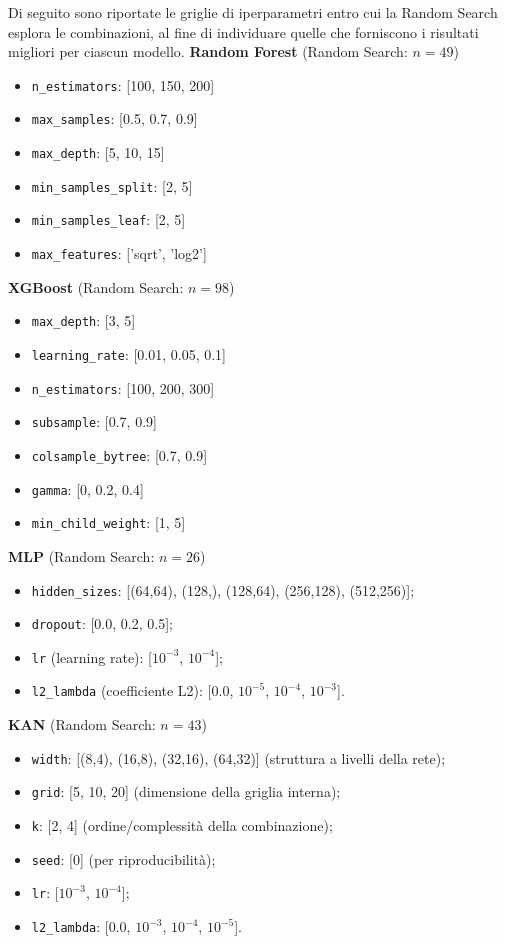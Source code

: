 \documentclass[a4paper,12pt]{report}
\begin{document}
	Di seguito sono riportate le griglie di iperparametri entro cui la Random Search esplora le combinazioni, al fine di individuare quelle che forniscono i risultati migliori per ciascun modello.
	\smallskip
	\noindent\textbf{Random Forest} \quad (Random Search: $n=49$)
	\begin{itemize}
		\item \texttt{n\_estimators}: [100, 150, 200]
		\item \texttt{max\_samples}: [0.5, 0.7, 0.9]
		\item \texttt{max\_depth}: [5, 10, 15]
		\item \texttt{min\_samples\_split}: [2, 5]
		\item \texttt{min\_samples\_leaf}: [2, 5]
		\item \texttt{max\_features}: ['sqrt', 'log2']
	\end{itemize}
	
	\smallskip
	\noindent\textbf{XGBoost} \quad (Random Search: $n=98$)
	\begin{itemize}
		\item \texttt{max\_depth}: [3, 5]
		\item \texttt{learning\_rate}: [0.01, 0.05, 0.1]
		\item \texttt{n\_estimators}: [100, 200, 300]
		\item \texttt{subsample}: [0.7, 0.9]
		\item \texttt{colsample\_bytree}: [0.7, 0.9]
		\item \texttt{gamma}: [0, 0.2, 0.4]
		\item \texttt{min\_child\_weight}: [1, 5]
	\end{itemize}
	
	\smallskip
	\noindent\textbf{MLP} \quad (Random Search: $n=26$)
	\begin{itemize}
		\item \texttt{hidden\_sizes}: [(64,64), (128,), (128,64), (256,128), (512,256)];
		\item \texttt{dropout}: [0.0, 0.2, 0.5];
		\item \texttt{lr} (learning rate): [$10^{-3}$, $10^{-4}$];
		\item \texttt{l2\_lambda} (coefficiente L2): [0.0, $10^{-5}$, $10^{-4}$, $10^{-3}$].
	\end{itemize}
	
	\smallskip
	\noindent\textbf{KAN} \quad (Random Search: $n=43$)
	\begin{itemize}
		\item \texttt{width}: [(8,4), (16,8), (32,16), (64,32)] (struttura a livelli della rete);
		\item \texttt{grid}: [5, 10, 20] (dimensione della griglia interna);
		\item \texttt{k}: [2, 4] (ordine/complessit\`a della combinazione);
		\item \texttt{seed}: [0] (per riproducibilit\`a);
		\item \texttt{lr}: [$10^{-3}$, $10^{-4}$];
		\item \texttt{l2\_lambda}: [0.0, $10^{-3}$, $10^{-4}$, $10^{-5}$].
	\end{itemize}
	
\end{document}
